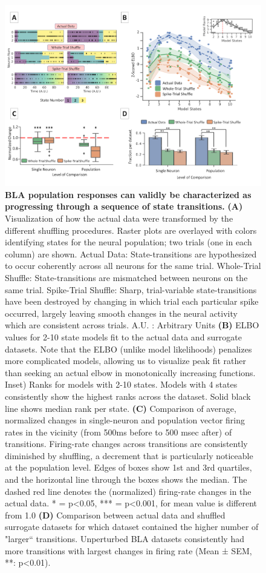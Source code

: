 \begin{refsection}
\begin{figure}
\includegraphics[width=\linewidth]{mahmood_22_figures/fig4-0.png}
\caption{\textbf{BLA population responses can validly be characterized as progressing through a sequence of state transitions.} \textbf{(A)} Visualization of how the actual data were transformed by the different shuffling procedures. Raster plots are overlayed with colors identifying states for the neural population; two trials (one in each column) are shown. Actual Data: State-transitions are hypothesized to occur coherently across all neurons for the same trial. Whole-Trial Shuffle: State-transitions are mismatched between neurons on the same trial. Spike-Trial Shuffle: Sharp, trial-variable state-transitions have been destroyed by changing in which trial each particular spike occurred, largely leaving smooth changes in the neural activity which are consistent across trials. A.U. : Arbitrary Units  \textbf{(B)} ELBO values for 2-10 state models fit to the actual data and surrogate datasets. Note that the ELBO (unlike model likelihoods) penalizes more complicated models, allowing us to visualize peak fit rather than seeking an actual elbow in monotonically increasing functions. Inset) Ranks for models with 2-10 states. Models with 4 states consistently show the highest ranks across the dataset. Solid black line shows median rank per state. \textbf{(C)} Comparison of average, normalized changes in single-neuron and population vector firing rates in the vicinity (from 500ms before to 500 msec after) of transitions. Firing-rate changes across transitions are consistently diminished by shuffling, a decrement that is particularly noticeable at the population level. Edges of boxes show 1st and 3rd quartiles, and the horizontal line through the boxes shows the median. The dashed red line denotes the (normalized) firing-rate changes in the actual data. * = p<0.05, *** = p<0.001, for mean value is different from 1.0 \textbf{(D)} Comparison between actual data and shuffled surrogate datasets for which dataset contained the higher number of "larger“ transitions. Unperturbed BLA datasets consistently had more transitions with largest changes in firing rate (Mean ± SEM, **: p<0.01).}
\label{fig:wrapfig}
\end{figure}


\end{refsection}
